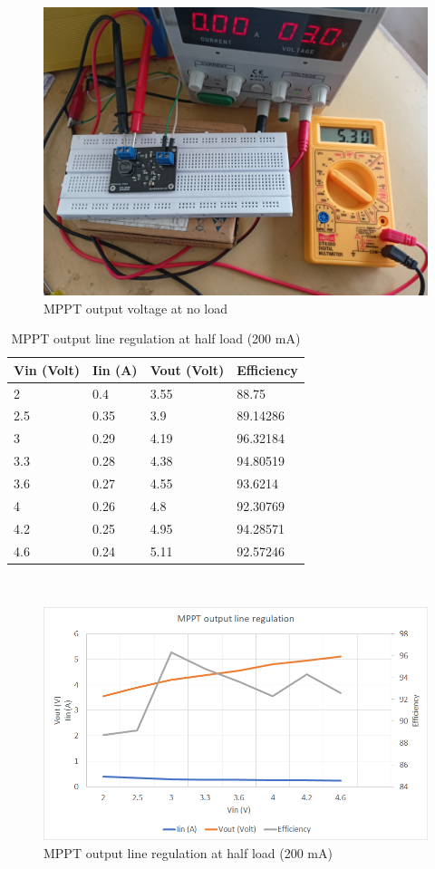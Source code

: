 \begin{figure}[H]
	\centering
	\includegraphics[width=0.7\columnwidth]{IMGS/TestSetupPics/MPPT_out.jpg}
	\caption{MPPT output voltage at no load}
	\label{fig:arch}
\end{figure}



\begin{table}[H]
\centering
\begin{tabular}{|l|l|l|l|}
\hline
Vin (Volt) & Iin (A) & Vout (Volt) & Efficiency \\ \hline
2          & 0.4     & 3.55        & 88.75      \\ \hline
2.5        & 0.35    & 3.9         & 89.14286   \\ \hline
3          & 0.29    & 4.19        & 96.32184   \\ \hline
3.3        & 0.28    & 4.38        & 94.80519   \\ \hline
3.6        & 0.27    & 4.55        & 93.6214    \\ \hline
4          & 0.26    & 4.8         & 92.30769   \\ \hline
4.2        & 0.25    & 4.95        & 94.28571   \\ \hline
4.6        & 0.24    & 5.11        & 92.57246   \\ \hline
\end{tabular}
\caption{MPPT output line regulation at half load (200 mA)}
\label{table:4}
\end{table}	
\\
\begin{figure}[h]
	\centering
	\includegraphics[width=\columnwidth]{IMGS/MPPT output line regulation at half load (200mA).png}
	\caption{MPPT output line regulation at half load (200 mA)}
	\label{fig:arch}
\end{figure}


